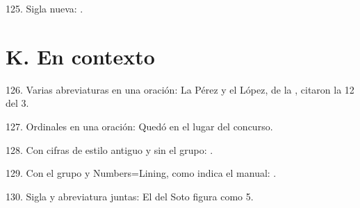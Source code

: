 \documentclass{article}
\begin{document}
125. Sigla nueva: .

\section*{K. En contexto}

126. Varias abreviaturas en una oración: La  Pérez y el  López, de la , citaron la  12 del  3.

127. Ordinales en una oración: Quedó en el  lugar del  concurso.

128. Con cifras de estilo antiguo y sin el grupo: .

129. Con el grupo y Numbers=Lining, como indica el manual: {}.

130. Sigla y abreviatura juntas: El  del  Soto figura como  5.
\end{document}
